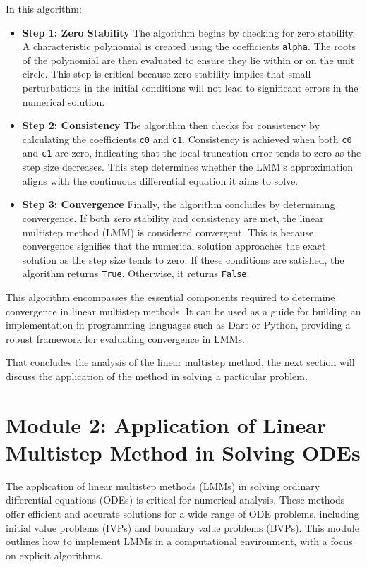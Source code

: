    In this algorithm:

\begin{itemize}
  \item \textbf{Step 1: Zero Stability} 
  The algorithm begins by checking for zero stability. A characteristic polynomial is created using the coefficients \texttt{alpha}. The roots of the polynomial are then evaluated to ensure they lie within or on the unit circle. This step is critical because zero stability implies that small perturbations in the initial conditions will not lead to significant errors in the numerical solution.

  \item \textbf{Step 2: Consistency} 
  The algorithm then checks for consistency by calculating the coefficients \texttt{c0} and \texttt{c1}. Consistency is achieved when both \texttt{c0} and \texttt{c1} are zero, indicating that the local truncation error tends to zero as the step size decreases. This step determines whether the LMM's approximation aligns with the continuous differential equation it aims to solve.

  \item \textbf{Step 3: Convergence} 
  Finally, the algorithm concludes by determining convergence. If both zero stability and consistency are met, the linear multistep method (LMM) is considered convergent. This is because convergence signifies that the numerical solution approaches the exact solution as the step size tends to zero. If these conditions are satisfied, the algorithm returns \texttt{True}. Otherwise, it returns \texttt{False}.

\end{itemize}

This algorithm encompasses the essential components required to determine convergence in linear multistep methods. It can be used as a guide for building an implementation in programming languages such as Dart or Python, providing a robust framework for evaluating convergence in LMMs.


That concludes the analysis of the linear multistep method, the next section will discuss the application of the method in solving a particular problem.

\section{Module 2: Application of Linear Multistep Method in Solving ODEs}

The application of linear multistep methods (LMMs) in solving ordinary differential equations (ODEs) is critical for numerical analysis. These methods offer efficient and accurate solutions for a wide range of ODE problems, including initial value problems (IVPs) and boundary value problems (BVPs). This module outlines how to implement LMMs in a computational environment, with a focus on explicit algorithms.

